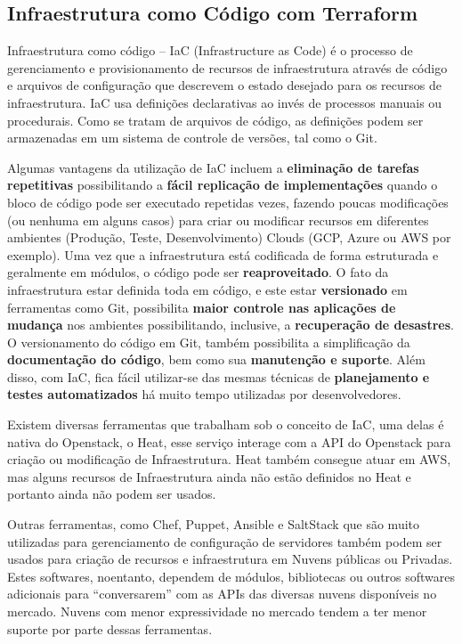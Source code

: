 \documentclass[12pt]{article}
\begin{document}
	\subsection{Infraestrutura como Código com Terraform}
	
	Infraestrutura como código – IaC (Infrastructure as Code) é o processo de gerenciamento e provisionamento de recursos de infraestrutura através de código e arquivos de configuração que descrevem o estado desejado para os recursos de infraestrutura. IaC usa definições declarativas ao invés de processos manuais ou procedurais. Como se tratam de arquivos de código, as definições podem ser armazenadas em um sistema de controle de versões, tal como o Git.
	
	Algumas vantagens da utilização de IaC incluem a \textbf{eliminação de tarefas repetitivas} possibilitando a  \textbf{fácil replicação de implementações} quando o bloco de código pode ser executado repetidas vezes, fazendo poucas modificações (ou nenhuma em alguns casos) para criar ou modificar recursos em diferentes ambientes (Produção, Teste, Desenvolvimento) Clouds (GCP, Azure ou AWS por exemplo). Uma vez que a infraestrutura  está codificada de forma estruturada e geralmente em módulos, o código pode ser \textbf{reaproveitado}. O fato da infraestrutura estar definida toda em código, e este estar \textbf{versionado} em ferramentas como Git, possibilita \textbf{maior controle nas aplicações de mudança} nos ambientes possibilitando, inclusive, a \textbf{recuperação de desastres}. O versionamento do código em Git, também possibilita a simplificação da \textbf{documentação do código}, bem como sua \textbf{manutenção e suporte}. Além disso, com IaC, fica fácil utilizar-se das mesmas técnicas de \textbf{planejamento e testes automatizados} há muito tempo utilizadas por desenvolvedores.
	
	Existem diversas ferramentas que trabalham sob o conceito de IaC, uma delas é nativa do Openstack, o Heat, esse serviço interage com a API do Openstack para criação ou modificação de Infraestrutura. Heat também consegue atuar em AWS, mas alguns recursos de Infraestrutura ainda não estão definidos no Heat e portanto ainda não podem ser usados. 
	
	Outras ferramentas, como Chef, Puppet, Ansible e SaltStack que são muito utilizadas para gerenciamento de configuração de servidores também podem ser usados para criação de recursos e infraestrutura em Nuvens públicas ou Privadas. Estes softwares, noentanto, dependem de módulos, bibliotecas ou outros softwares adicionais para “conversarem” com as APIs das diversas nuvens disponíveis no mercado. Nuvens com menor expressividade no mercado tendem a ter menor suporte por parte dessas ferramentas.
	
\end{document}
